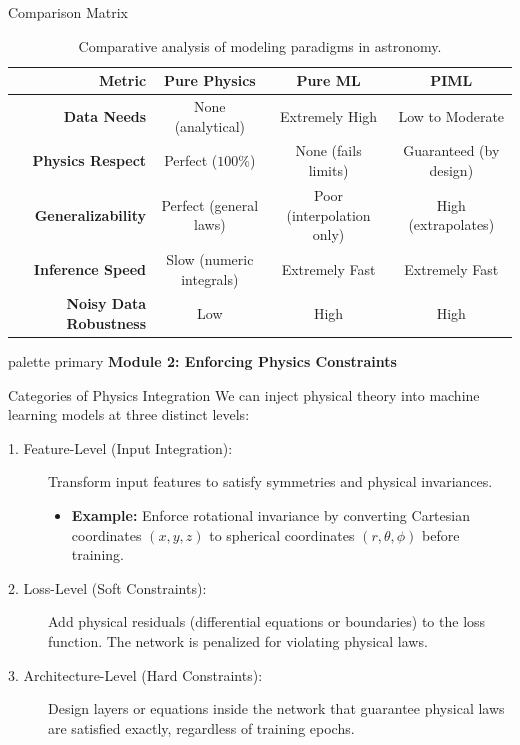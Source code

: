 \documentclass[9pt]{beamer}
\begin{document}
\begin{frame}{Comparison Matrix}
  \begin{table}
    \centering
    \begin{tabular}{r c c c}
      \toprule
      \textbf{Metric} & \textbf{Pure Physics} & \textbf{Pure ML} & \textbf{PIML} \\
      \midrule
      \textbf{Data Needs} & None (analytical) & Extremely High & Low to Moderate \\
      \textbf{Physics Respect} & Perfect ($100\%$) & None (fails limits) & Guaranteed (by design) \\
      \textbf{Generalizability} & Perfect (general laws) & Poor (interpolation only) & High (extrapolates) \\
      \textbf{Inference Speed} & Slow (numeric integrals) & Extremely Fast & Extremely Fast \\
      \textbf{Noisy Data Robustness} & Low & High & High \\
      \bottomrule
    \end{tabular}
    \caption{Comparative analysis of modeling paradigms in astronomy.}
  \end{table}
\end{frame}

\begin{frame}[plain]
  \vfill
  \centering
  \begin{beamercolorbox}[sep=8pt,center,shadow=true,rounded=true]{palette primary}
    \textbf{Module 2: Enforcing Physics Constraints}
  \end{beamercolorbox}
  \vfill
\end{frame}

\begin{frame}{Categories of Physics Integration}
  We can inject physical theory into machine learning models at three distinct levels:
  \begin{description}
    \item[1. Feature-Level (Input Integration):]
      Transform input features to satisfy symmetries and physical invariances.
      \begin{itemize}
        \item \textbf{Example:} Enforce rotational invariance by converting Cartesian coordinates $(x, y, z)$ to spherical coordinates $(r, \theta, \phi)$ before training.
      \end{itemize}
    \item[2. Loss-Level (Soft Constraints):]
      Add physical residuals (differential equations or boundaries) to the loss function. The network is penalized for violating physical laws.
    \item[3. Architecture-Level (Hard Constraints):]
      Design layers or equations inside the network that guarantee physical laws are satisfied exactly, regardless of training epochs.
  \end{description}
\end{frame}
\end{document}
